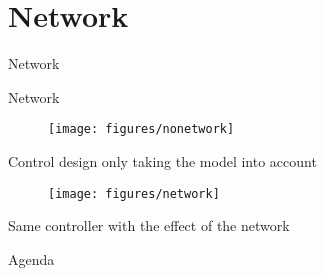 \section{Network}
\begin{frame}{Network}{}

\end{frame}

\begin{frame}{Network}{}
    
    \begin{minipage}{\linewidth}
        \begin{minipage}{0.49\linewidth}
            \begin{figure}[H]
                \texttt{[image: figures/nonetwork]}
            \end{figure}
            \centering
            Control design only taking the model into account
        \end{minipage}
        \hspace{0.03\linewidth}
        \begin{minipage}{0.49\linewidth}
            \begin{figure}[H]
                \texttt{[image: figures/network]}
            \end{figure}  
            \centering
            Same controller with the effect of the network                   
        \end{minipage}
    \end{minipage}  
\end{frame}

\begin{frame}{Agenda}{}
    \tableofcontents
\end{frame}

